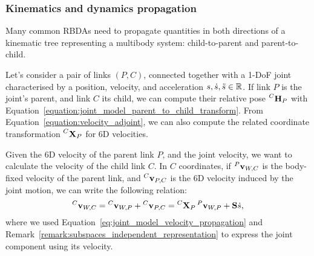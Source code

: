\subsubsection{Kinematics and dynamics propagation}
\label{sec:joint_kin_dyn_propagation}

Many common \acp{RBDA} need to propagate quantities in both directions of a kinematic tree representing a multibody system: child-to-parent and parent-to-child.

Let's consider a pair of links $(P, C)$, connected together with a 1-\ac{DoF} joint characterised by a position, velocity, and acceleration $\shape, \dot{\shape}, \ddot{\shape} \in \realn$.
If link $P$ is the joint's parent, and link $C$ its child, we can compute their relative pose $\homo[C]_P$ with Equation~\eqref{equation:joint_model_parent_to_child_transform}.
From Equation~\eqref{equation:velocity_adjoint}, we can also compute the related coordinate transformation $\transvel[C]_P$ for 6D velocities.

\begin{definition*}
%
Given the 6D velocity of the parent link $P$, and the joint velocity, we want to calculate the velocity of the child link $C$.
In $C$ coordinates, if $\velsix[P]_{W,C}$ is the body-fixed velocity of the parent link, and $\velsix[C]_{P,C}$ is the 6D velocity induced by the joint motion, we can write the following relation:
%
\begin{equation*}
    \velsix[C]_{W,C}
    = \velsix[C]_{W,P} + \velsix[C]_{P,C}
    = \transvel[C]_P \velsix[P]_{W,P} + \subspace \dot{\shape}
    ,
\end{equation*}
%
where we used Equation~\eqref{eq:joint_model_velocity_propagation} and Remark~\ref{remark:subspaces_independent_representation} to express the joint component using its velocity.
%
\end{definition*}

